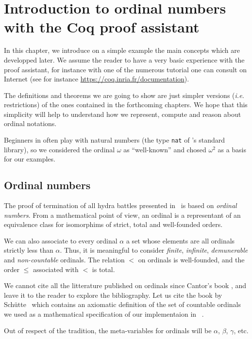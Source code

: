 \chapter{Introduction to ordinal numbers with the Coq proof assistant}

In this chapter, we introduce on a simple example the main concepts which are developped later. We assume the reader to have a very basic experience with the \coq{} proof assistant, for instance with one of the numerous tutorial one can consult on Internet
(see for instance \url{https://coq.inria.fr/documentation}). 

The definitions  and theorems we are going to show are just simpler versions (\emph{i.e.} restrictions) of the ones contained in the forthcoming chapters. We hope that this simplicity will help to understand how we represent, compute and reason about ordinal notations.

Beginners in \coq{} often play with natural numbers (the type \texttt{nat} of \coq's 
standard library), so we considered the ordinal  $\omega$ as ``well-known'' and chosed 
$\omega^2$ as a basis for our examples.



\section{Ordinal numbers}

The proof of termination of all hydra battles presented in~\cite{KP82} is based
on \emph{ordinal numbers}.
From a mathematical point of view, an ordinal is a representant of an equivalence class for isomorphims of strict, total and well-founded orders.

We can also associate to every ordinal $\alpha$ a set whose elements are all ordinals strictly less than $\alpha$. Thus, it is meaningful  to consider \emph{finite}, \emph{infinite}, \emph{demunerable} and \emph{non-countable} ordinals.
The relation $<$ on ordinals is well-founded, and the order $\leq$ associated with
$<$ is total.

We cannot cite all the litterature published on ordinals since Cantor's book 
\cite{cantorbook}, and 
leave it to the reader to explore the bibliography. Let us cite the book by Schütte~\cite{schutte} which contains an axiomatic definition of the set of countable ordinals we used as a mathematical specification of our implementaion in \coq{}~\cite{CantorContrib}. 


Out of respect of the tradition, the meta-variables for ordinals will be 
 $\alpha$, $\beta$, $\gamma$, etc. 

